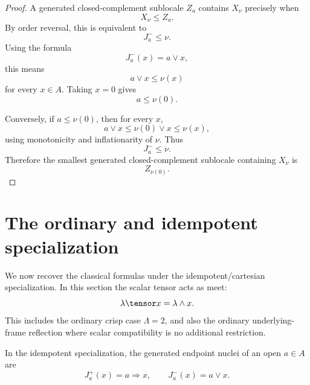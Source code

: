 \begin{proof}
A generated closed-complement sublocale \(Z_a\) contains \(X_\nu\) precisely
when
\[
    X_\nu\leq Z_a.
\]
By order reversal, this is equivalent to
\[
    J_a^-\leq\nu.
\]
Using the formula
\[
    J_a^-(x)=a\vee x,
\]
this means
\[
    a\vee x\leq\nu(x)
\]
for every \(x\in A\).  Taking \(x=0\) gives
\[
    a\leq\nu(0).
\]

Conversely, if \(a\leq\nu(0)\), then for every \(x\),
\[
    a\vee x
    \leq
    \nu(0)\vee x
    \leq
    \nu(x),
\]
using monotonicity and inflationarity of \(\nu\).  Thus
\[
    J_a^-\leq\nu.
\]
Therefore the smallest generated closed-complement sublocale containing
\(X_\nu\) is
\[
    Z_{\nu(0)}.
\]
\end{proof}

\section{The ordinary and idempotent specialization}
\label{sec:ordinary-idempotent-specialization}

We now recover the classical formulas under the idempotent/cartesian
specialization.  In this section the scalar tensor acts as meet:
\[
    \lambda\tensor x=\lambda\wedge x.
\]
This includes the ordinary crisp case \(\Lambda=2\), and also the ordinary
underlying-frame reflection where scalar compatibility is no additional
restriction.

\begin{theorem}
\label{thm:idempotent-endpoint-nuclei}
In the idempotent specialization, the generated endpoint nuclei of an open
\(a\in A\) are
\[
    J_a^+(x)=a\Rightarrow x,
    \qquad
    J_a^-(x)=a\vee x.
\]
\end{theorem}

